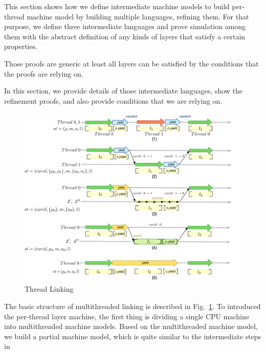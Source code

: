 This section shows how we define intermediate machine models to build per-thread machine
model by building 
multiple languages, refining them. 
For that purpose, 
we define three intermediate languages 
and prove simulation among them with the abstract definition 
of any kinds of layers that satisfy a certain properties. 

Those proofs are generic at least all layers can be satisfied by 
the conditions that the proofs are relying on. 

In this section, we provide details of those intermediate languages,
show the refinement proofs,
and also provide conditions that we are relying on.


\begin{figure}
\vspace{-14pt}
\includegraphics[scale=.40]{figs/thread-linking}
\vspace{-5pt}
\caption{Thread Linking}
\label{fig:thread-linking}
\vspace{-5pt}
\end{figure}

The basic structure of multithreaded linking is described in Fig.~\ref{fig:thread-linking}.
To introduced the per-thread layer machine, 
the first thing is dividing a single CPU machine into multithreaded machine models. 
Based on the multithreaded machine model, 
we build a partial machine model, which is quite similar to the intermediate steps in





